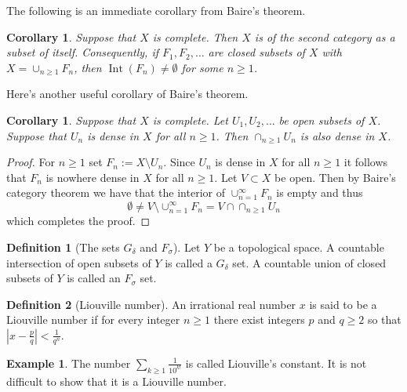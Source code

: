 \documentclass[11pt,a4paper]{article}
\theoremstyle{definition}
\newtheorem{definition}{Definition}[section]
\newtheorem{example}{Example}[section]
\theoremstyle{plain}
\newtheorem{corollary}[theorem]{Corollary}
\DeclareMathOperator{\Int}{Int}
\newcommand{\abs}[1]{\left\lvert #1\right\rvert}
\begin{document}
  The following is an immediate corollary from Baire's theorem.
  
  \begin{corollary}
    Suppose that $X$ is complete. Then $X$ is of the second category as a
    subset of itself. Consequently, if $F_1,F_2,\dots$ are closed subsets 
    of $X$ with $X = \cup_{n \geq 1}{F_n}$, then $\Int(F_n) \neq \emptyset$ 
    for some $n \geq 1$.
  \end{corollary}
  
  Here's another useful corollary of Baire's theorem.
  
  \begin{corollary}
    Suppose that $X$ is complete. Let $U_1,U_2,\dots$ be open subsets of $X$.
    Suppose that $U_n$ is dense in $X$ for all $n \geq 1$. Then 
    $\cap_{n \geq 1}{U_n}$ is also dense in $X$.
  \end{corollary}
  \begin{proof}
    For $n \geq 1$ set $F_n := X \setminus U_n$. Since $U_n$ is dense in $X$
    for all $n \geq 1$ it follows that $F_n$ is nowhere dense in $X$ for
    all $n \geq 1$. Let $V \subset X$ be open. Then by Baire's category
    theorem we have that the interior of $\cup_{n=1}^{\infty} F_n$ is
    empty and thus
    \[
      \emptyset \neq 
      V \setminus \cup_{n=1}^{\infty} F_n =
      V \cap \cap_{n \geq 1}{U_n}
    \]
    which completes the proof.
  \end{proof}
  
  \begin{definition}[The sets $G_\delta$ and $F_\sigma$]
    Let $Y$ be a topological space. A countable intersection of open
    subsets of $Y$ is called a $G_\delta$ set. A countable union of closed 		
    subsets of $Y$ is called an $F_\sigma$ set.
  \end{definition}

  \begin{definition}[Liouville number]
    An irrational real number $x$ is said to be a Liouville number if
    for every integer $n \geq 1$ there exist integers $p$ and $q \geq 2$ 
    so that $\abs{x - \frac{p}{q}} < \frac{1}{q^n}$.
  \end{definition}

  \begin{example}
    The number $\sum_{k \geq 1}{\frac{1}{10^{k!}}}$ is called Liouville’s 
    constant. It is not difficult to show that it is a Liouville number.
  \end{example}
\end{document}
